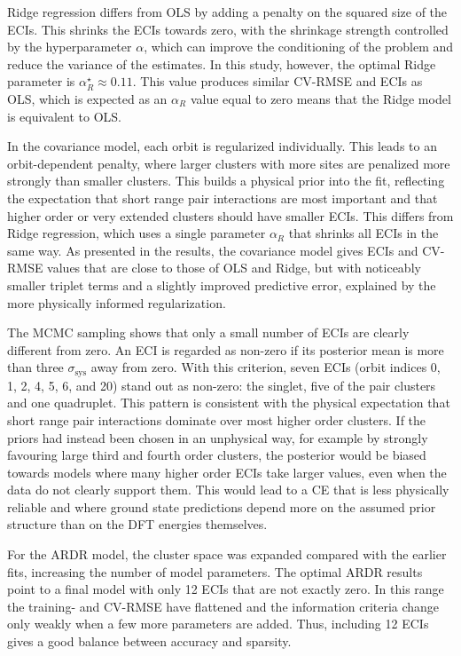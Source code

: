 \documentclass[a4paper, 12pt]{article}
\begin{document}
Ridge regression differs from OLS by adding a penalty on the squared size of the ECIs. This shrinks the ECIs towards zero, with the shrinkage strength controlled by the hyperparameter $\alpha$, which can improve the conditioning of the problem and reduce the variance of the estimates. In this study, however, the optimal Ridge parameter is $\alpha^\star_R \approx 0.11$. This value produces similar CV-RMSE and ECIs as OLS, which is expected as an $\alpha_R$ value equal to zero means that the Ridge model is equivalent to OLS.

In the covariance model, each orbit is regularized individually. This leads to an orbit-dependent penalty, where larger clusters with more sites are penalized more strongly than smaller clusters. This builds a physical prior into the fit, reflecting the expectation that short range pair interactions are most important and that higher order or very extended clusters should have smaller ECIs. This differs from Ridge regression, which uses a single parameter $\alpha_R$ that shrinks all ECIs in the same way. As presented in the results, the covariance model gives ECIs and CV-RMSE values that are close to those of OLS and Ridge, but with noticeably smaller triplet terms and a slightly improved predictive error, explained by the more physically informed regularization.

The MCMC sampling shows that only a small number of ECIs are clearly different from zero. An ECI is regarded as non-zero if its posterior mean is more than three $\sigma_\text{sys}$ away from zero. With this criterion, seven ECIs (orbit indices 0, 1, 2, 4, 5, 6, and 20) stand out as non-zero: the singlet, five of the pair clusters and one quadruplet. This pattern is consistent with the physical expectation that short range pair interactions dominate over most higher order clusters. If the priors had instead been chosen in an unphysical way, for example by strongly favouring large third and fourth order clusters, the posterior would be biased towards models where many higher order ECIs take larger values, even when the data do not clearly support them. This would lead to a CE that is less physically reliable and where ground state predictions depend more on the assumed prior structure than on the DFT energies themselves.

For the ARDR model, the cluster space was expanded compared with the earlier fits, increasing the number of model parameters. The optimal ARDR results point to a final model with only 12 ECIs that are not exactly zero. In this range the training- and CV-RMSE have flattened and the information criteria change only weakly when a few more parameters are added. Thus, including 12 ECIs gives a good balance between accuracy and sparsity.
\end{document}
